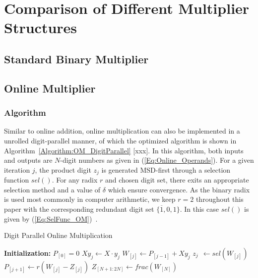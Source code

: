 
\section{Comparison of Different Multiplier Structures}
\subsection{Standard Binary Multiplier}

\subsection{Online Multiplier}
\subsubsection{Algorithm}
Similar to online addition, online multiplication can also be implemented in a unrolled digit-parallel manner, of which the optimized algorithm is shown in Algorithm~\ref{Algorithm:OM_DigitParallel} [xxx]. In this algorithm, both inputs and outputs are $N$-digit numbers as given in (\ref{Eq:Online_Operands}). For a given iteration $j$, the product digit $z_j$ is generated MSD-first through a selection function $sel()$. For any radix $r$ and chosen digit set, there exits an appropriate selection method and a value of $\delta$ which ensure convergence. As the binary radix is used most commonly in computer arithmetic, we keep $r=2$ throughout this paper with the corresponding redundant digit set $\{\overline{1},0,1\}$. In this case $sel()$ is given by (\ref{Eq:SelFunc_OM})~\cite{Ercegovac_OnlineMult}.

\begin{algorithm}[tbp]
  \caption{Digit Parallel Online Multiplication}\label{Algorithm:OM_DigitParallel}
  \begin{algorithmic}[1]
    \State \textbf{Initialization:} $P_{[0]}=0$                     \vspace{.5ex}
                                           \vspace{.5ex}
        \State $Xy_j \leftarrow X \cdot y_j$                        \vspace{.5ex}
        \State $W_{[j]}    \leftarrow  P_{[j-1]} + Xy_j$            \vspace{.5ex}
        \State $z_{j}  ~~      \leftarrow  sel(W_{[j]})$            \vspace{.5ex}
        \State $P_{[j+1]}  \leftarrow  r\left(W_{[j]}-Z_{[j]}\right)$   \vspace{.5ex}
    \EndFor                                                         \vspace{.5ex}
    \State $Z_{[N+1:2N]} \leftarrow frac(W_{[N]})$                  \vspace{.5ex}
  \end{algorithmic}
  \vspace{-1ex}
\end{algorithm}

